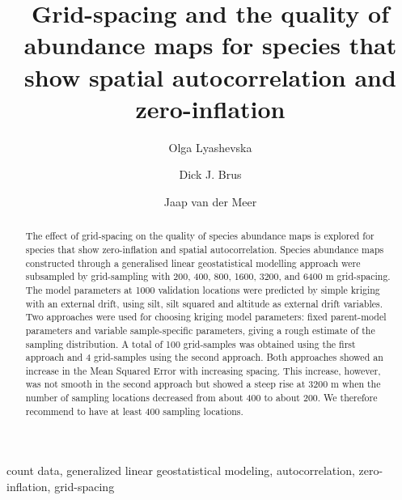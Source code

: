 \documentclass[review]{elsarticle}
\begin{document}
\begin{frontmatter}

\title{Grid-spacing and the quality of abundance maps for species that show spatial autocorrelation and zero-inflation}

\author[1]{Olga Lyashevska}

\author[2]{Dick J. Brus}

\author[1]{Jaap van der Meer}


\address[1]{Department of Marine Ecology\\
NIOZ Royal Netherlands Institute for Sea Research\\
P.O. Box 59 1790 AB Den Burg\\
Texel, The Netherlands}

\address[2]{Alterra, Wageningen University and Research Centre\\
P.O. Box 47, 6700AA\\
Wageningen, The Netherlands}

\begin{abstract}
The effect of grid-spacing on the quality of species abundance maps is explored for species that show zero-inflation and spatial autocorrelation.
Species abundance maps constructed through a generalised linear geostatistical modelling approach were subsampled by grid-sampling with 200, 400, 800, 1600, 3200, and 6400 m grid-spacing.
The model parameters at 1000 validation locations were predicted by simple kriging with an external drift, using silt, silt squared and altitude as external drift variables. 
Two approaches were used for choosing kriging model parameters: fixed parent-model parameters and variable sample-specific parameters, giving a rough estimate of the sampling distribution.
A total of 100 grid-samples was obtained using the first approach and 4 grid-samples using the second approach. 
Both approaches showed an increase in the Mean Squared Error with increasing spacing.
This increase, however,  was not smooth in the second approach but showed a steep rise at 3200 m when the number of sampling locations decreased from about 400 to about 200.
We therefore recommend to have at least 400 sampling locations.
\end{abstract}

\begin{keyword}
count data, generalized linear geostatistical modeling, autocorrelation, zero-inflation, grid-spacing
\end{keyword}

\end{frontmatter}
\end{document}

